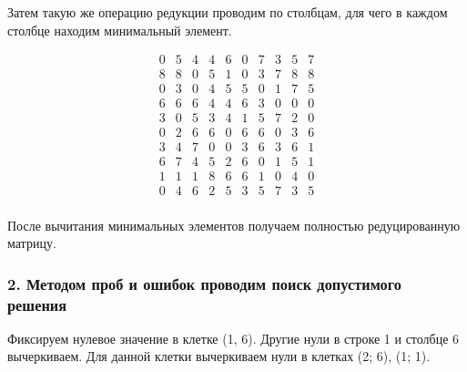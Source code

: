 \documentclass[17pt]{extarticle}
\begin{document}
Затем такую же операцию редукции проводим по столбцам, для чего в каждом столбце находим минимальный элемент.

\[
    \begin{array}{*{10}{c}}
        0 & 5 & 4 & 4 & 6 & 0 & 7 & 3 & 5 & 7 \\
        8 & 8 & 0 & 5 & 1 & 0 & 3 & 7 & 8 & 8 \\
        0 & 3 & 0 & 4 & 5 & 5 & 0 & 1 & 7 & 5 \\
        6 & 6 & 6 & 4 & 4 & 6 & 3 & 0 & 0 & 0 \\
        3 & 0 & 5 & 3 & 4 & 1 & 5 & 7 & 2 & 0 \\
        0 & 2 & 6 & 6 & 0 & 6 & 6 & 0 & 3 & 6 \\
        3 & 4 & 7 & 0 & 0 & 3 & 6 & 3 & 6 & 1 \\
        6 & 7 & 4 & 5 & 2 & 6 & 0 & 1 & 5 & 1 \\
        1 & 1 & 1 & 8 & 6 & 6 & 1 & 0 & 4 & 0 \\
        0 & 4 & 6 & 2 & 5 & 3 & 5 & 7 & 3 & 5 \\
    \end{array}
\]

После вычитания минимальных элементов получаем полностью редуцированную матрицу.

\subsubsection*{2. Методом проб и ошибок проводим поиск допустимого решения}

Фиксируем нулевое значение в клетке (1, 6). Другие нули в строке 1 и столбце 6 вычеркиваем. Для данной клетки вычеркиваем нули в клетках (2; 6), (1; 1).
\end{document}
